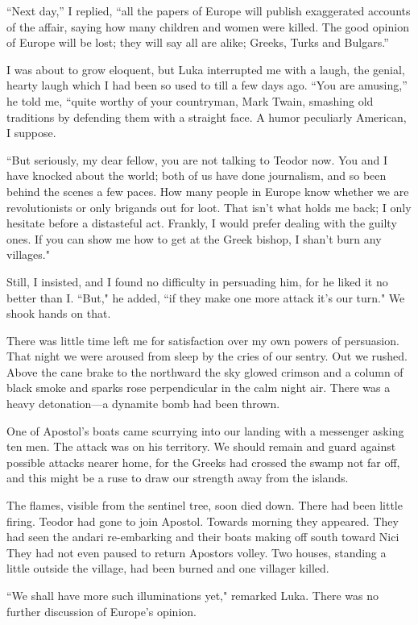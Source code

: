 \documentclass[a5paper,12pt]{book}
\begin{document}
“Next day,” I replied, “all the papers of Europe will publish exaggerated accounts of the affair, saying how many children and women were killed. The good opinion of Europe will be lost; they will say all are alike; Greeks, Turks and Bulgars.” 

I was about to grow eloquent, but Luka interrupted me with a laugh, the genial, hearty laugh which I had been so used to till a few days ago. “You are amusing,” he told me, “quite worthy of your countryman, Mark Twain, smashing old traditions by defending them with a straight face. A humor peculiarly American, I suppose. 

“But seriously, my dear fellow, you are not talking to Teodor now. You and I have knocked about the world; both of us have done journalism, and so been behind the scenes a few paces. How many people in Europe know whether we are revolutionists or only brigands out for loot. That isn’t what holds me back; I only hesitate before a distasteful act. Frankly, I would prefer dealing with the guilty ones. If you can show me how to get at the Greek bishop, I shan't burn any villages."

Still, I insisted, and I found no difficulty in persuading him, for he liked it no better than I. “But," he added, “if they make one more attack it’s our turn." We shook hands on that. 

There was little time left me for satisfaction over my own powers of persuasion. That night we were aroused from sleep by the cries of our sentry. Out we rushed. Above the cane brake to the northward the sky glowed crimson and a column of black smoke and sparks rose perpendicular in the calm night air. There was a heavy detonation—a dynamite bomb had been thrown. 

One of Apostol's boats came scurrying into our landing with a messenger asking ten men. The attack was on his territory. We should remain and guard against possible attacks nearer home, for the Greeks had crossed the swamp not far off, and this might be a ruse to draw our strength away from the islands. 

The flames, visible from the sentinel tree, soon died down. There had been little firing. Teodor had gone to join Apostol. Towards morning they appeared. They had seen the andari re-embarking and their boats making off south toward Nici They had not even paused to return Apostors volley. Two houses, standing a little outside the village, had been burned and one villager killed. 

“We shall have more such illuminations yet," remarked Luka. There was no further discussion of Europe’s opinion. 
\end{document}
